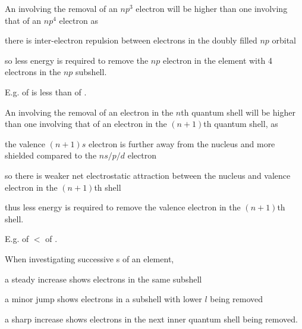 \documentclass[Chemistry.tex]{subfiles}
\begin{document}
An \slIE{} involving the removal of an \(np^3\) electron will be higher than one involving that of an \(np^4\) electron as \begin{slinenum}
\item there is inter-electron repulsion between electrons in the doubly filled \(np\) orbital
\item so less energy is required to remove the \(np\) electron in the element with 4 electrons in the \(np\) subshell.\end{slinenum} E.g.  of  is less than  of .

An \slIE{} involving the removal of an electron in the \(n\)th quantum shell will be higher than one involving that of an electron in the \((n+1)\)th quantum shell, as \begin{slinenum}
\item the valence \((n+1)s\) electron is further away from the nucleus and more shielded compared to the \(ns/p/d\) electron
\item so there is weaker net electrostatic attraction between the nucleus and valence electron in the \((n+1)\)th shell
\item thus less energy is required to remove the valence electron in the \((n+1)\)th shell.\end{slinenum} E.g.  of  \(<\)  of .

When investigating successive \slIE{}s of an element, \begin{slinenum}
\item a steady increase shows electrons in the same subshell
\item a minor jump shows electrons in a subshell with lower \(l\) being removed
\item a sharp increase shows electrons in the next inner quantum shell being removed.\end{slinenum}
\end{document}
